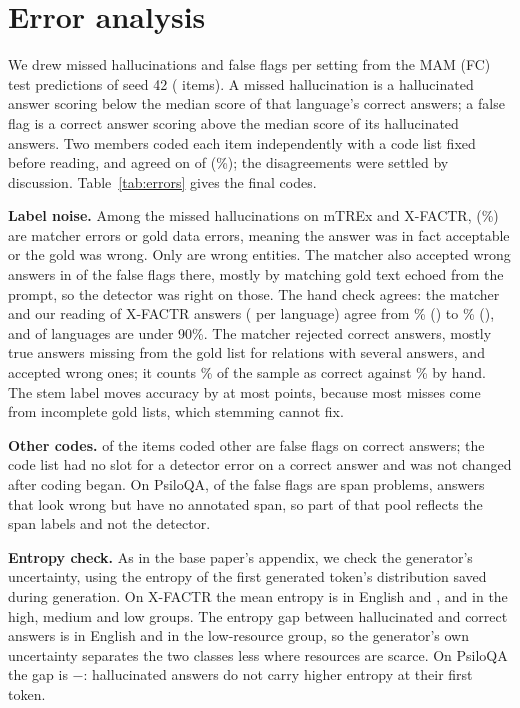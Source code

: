 \documentclass[12pt]{article}
\newcommand{\minus}{−}
\begin{document}
\section{Error analysis}
We drew \errcell{} missed hallucinations and \errcell{} false flags per setting from the MAM (FC) test predictions of seed 42 (\errn{} items). A missed hallucination is a hallucinated answer scoring below the median score of that language's correct answers; a false flag is a correct answer scoring above the median score of its hallucinated answers. Two members coded each item independently with a code list fixed before reading, and agreed on \erragree{} of \errn{} (\errshare\%); the \errdisagree{} disagreements were settled by discussion. Table~\ref{tab:errors} gives the final codes.



\textbf{Label noise.} Among the \errmissn{} missed hallucinations on mTREx and X-FACTR, \errmissnoise{} (\errmissnoisepct\%) are matcher errors or gold data errors, meaning the answer was in fact acceptable or the gold was wrong. Only \errmisswrong{} are wrong entities. The matcher also accepted wrong answers in \errflagmatcher{} of the \errflagn{} false flags there, mostly by matching gold text echoed from the prompt, so the detector was right on those. The hand check agrees: the matcher and our reading of \hcn{} X-FACTR answers (\hcper{} per language) agree from \hcagmin\% (\hcmin{}) to \hcagmax\% (\hcmax{}), and \hcunder{} of \hclangs{} languages are under 90\%. The matcher rejected \hcrejected{} correct answers, mostly true answers missing from the gold list for relations with several answers, and accepted \hcaccepted{} wrong ones; it counts \hcmatcher\% of the sample as correct against \hchand\% by hand. The stem label moves accuracy by at most \stemmax{} points, because most misses come from incomplete gold lists, which stemming cannot fix.

\textbf{Other codes.} \errotherflag{} of the \errother{} items coded other are false flags on correct answers; the code list had no slot for a detector error on a correct answer and was not changed after coding began. On PsiloQA, \errspanflag{} of the \errpsflag{} false flags are span problems, answers that look wrong but have no annotated span, so part of that pool reflects the span labels and not the detector.

\textbf{Entropy check.} As in the base paper's appendix, we check the generator's uncertainty, using the entropy of the first generated token's distribution saved during generation. On X-FACTR the mean entropy is \entenmean{} in English and \enthigh{}, \entmed{} and \entlow{} in the high, medium and low groups. The entropy gap between hallucinated and correct answers is \entengap{} in English and \entlowgap{} in the low-resource group, so the generator's own uncertainty separates the two classes less where resources are scarce. On PsiloQA the gap is \minus\entpsgap{}: hallucinated answers do not carry higher entropy at their first token.
\end{document}

